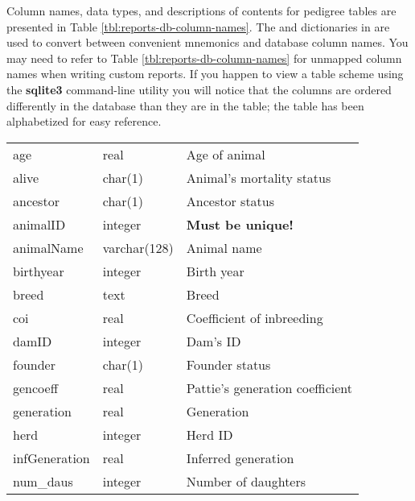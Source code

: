 Column names, data types, and descriptions of contents for pedigree tables are presented in Table
\ref{tbl:reports-db-column-names}.  The  and  dictionaries in
 are used to convert between convenient mnemonics and database column names.  You may need to refer
to Table \ref{tbl:reports-db-column-names} for unmapped column names when writing custom reports.  If you happen
to view a table scheme using the \textbf{sqlite3} command-line utility you will notice that the columns are ordered
differently in the database than they are in the table; the table has been alphabetized for easy reference.
\begin{center}
    \tablelasttail{\hline}
    \label{tbl:reports-db-column-names}
    \begin{xtabular}{llp{2.5in}}
	age           &   real          &  Age of animal \\
	alive         &   char(1)       &  Animal's mortality status \\
	ancestor      &   char(1)       &  Ancestor status \\
	animalID      &   integer       &  \textbf{Must be unique!} \\
	animalName    &   varchar(128)  &  Animal name \\
	birthyear     &   integer       &  Birth year \\
	breed         &   text          &  Breed \\
	coi           &   real          &  Coefficient of inbreeding \\
	damID         &   integer       &  Dam's ID \\
	founder       &   char(1)       &  Founder status \\
	gencoeff      &   real          &  Pattie's generation coefficient \\
	generation    &   real          &  Generation \\
	herd          &   integer       &  Herd ID \\
	infGeneration &   real          &  Inferred generation \\
	num\_daus     &   integer       &  Number of daughters \\

\end{xtabular}
\end{center}
